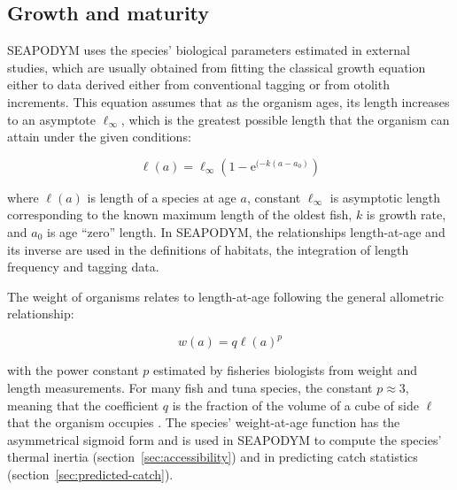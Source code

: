 \subsection{Growth and maturity}\label{sec:sp-biology}

SEAPODYM uses the species' biological parameters estimated in external studies, which are usually obtained from fitting the classical \citet{Bertalanffy} growth equation either to data derived either from conventional tagging or from otolith increments. This equation assumes that as the organism ages, its length increases to an asymptote $\ell_{\infty}$, which is the greatest possible length that the organism can attain under the given conditions:

\begin{equation}
\ell(a) = \ell_{\infty}\left(1- \mathrm{e}^{(-k(a-a_0)}\right)
\label{eq:vonBertalanffy}
\end{equation}

\noindent where $\ell(a)$ is length of a species at age $a$, constant $\ell_{\infty}$ is asymptotic length corresponding to the known maximum length of the oldest fish, $k$ is growth rate, and $a_0$ is age ``zero'' length. In SEAPODYM, the relationships length-at-age and its inverse are used in the definitions of habitats, the integration of length frequency and tagging data.

The weight of organisms relates to length-at-age following the general allometric relationship:

\begin{equation}
w(a)=q{\ell}(a)^p
\label{eq:weight-at-length}
\end{equation}

\noindent with the power constant $p$ estimated by fisheries biologists from weight and length measurements. For many fish and tuna species, the constant $p \approx 3$, meaning that the coefficient $q$ is the fraction of the volume of a cube of side $\ell$ that the organism occupies \citep*[see][]{Beverton-Holt}. The species' weight-at-age function has the asymmetrical sigmoid form and is used in SEAPODYM to compute the species' thermal inertia (section~\ref{sec:accessibility}) and in predicting catch statistics (section~\ref{sec:predicted-catch}).

